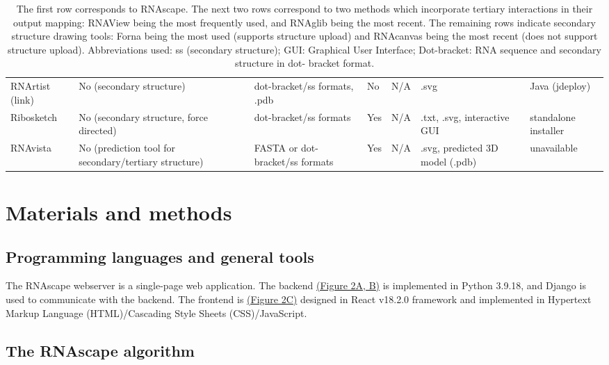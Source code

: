 \begin{table}[]
{\begin{tabular}{lllllll}
RNArtist (link) & No (secondary structure) & dot-bracket/ss formats, .pdb & No & N/A & .svg & Java (jdeploy) \\
Ribosketch \citep{Lu2018} & No (secondary structure, force   directed) & dot-bracket/ss formats & Yes & N/A & .txt, .svg, interactive GUI & standalone installer \\
RNAvista \citep{antczak2019rnavista} & No (prediction tool for secondary/tertiary   structure) & FASTA or dot-bracket/ss formats & Yes & N/A & .svg, predicted 3D model (.pdb) & unavailable
\end{tabular}%
}
\caption[escription of various attributes of relevant tools which produce 2D
visualizations of RNA.]{The first row corresponds to RNAscape. The next two rows correspond to two methods which incorporate tertiary interactions in their output mapping: RNAView \citep{Yang2003} being the most
frequently used, and RNAglib \citep{Mallet2022} being the most recent. The remaining rows indicate secondary
structure drawing tools: Forna \citep{Kerpedjiev2015} being the most used (supports structure upload) and RNAcanvas \citep{Johnson2023} being the most recent (does not support structure upload). Abbreviations used: ss (secondary
structure); GUI: Graphical User Interface; Dot-bracket: RNA sequence and secondary structure in dot-
bracket format.}
\end{table}

\section{Materials and methods} 

\subsection{Programming languages and general tools}

The RNAscape webserver is a single-page web application. The backend \hyperref[fig:rnascape2]{(Figure 2A, B)} is implemented in Python 3.9.18, and Django \citep{Django2019} is used to communicate with the backend. The frontend is \hyperref[fig:rnascape2]{(Figure 2C)} designed in React v18.2.0 framework and implemented in Hypertext Markup Language (HTML)/Cascading Style Sheets (CSS)/JavaScript.

\subsection{The RNAscape algorithm}

